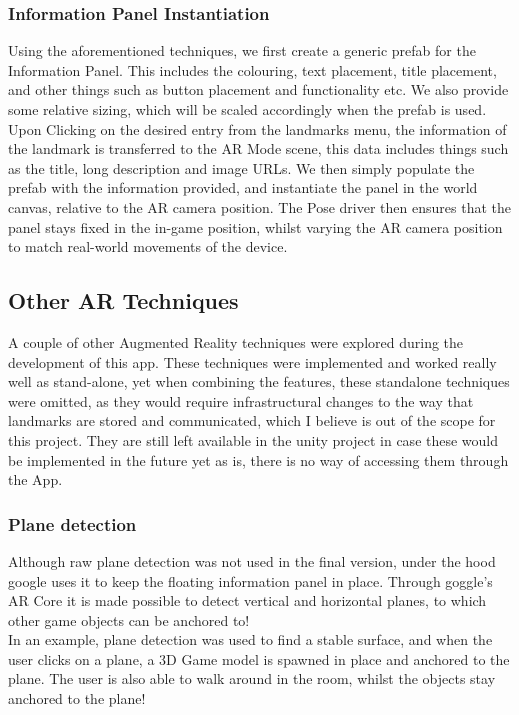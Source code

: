  \subsubsection{Information Panel Instantiation}
 Using the aforementioned techniques, we first create a generic prefab for the Information Panel. This includes the colouring, text placement, title placement, and 
 other things such as button placement and functionality etc. We also provide some relative sizing, which will be scaled accordingly when the prefab is used.\\
 Upon Clicking on the desired entry from the landmarks menu, the information of the landmark is transferred to the AR Mode scene, this data includes things such as 
 the title, long description and image URLs. We then simply populate the prefab with the information provided, and instantiate the panel in the world canvas, 
 relative to the AR camera position. The Pose driver then ensures that the panel stays fixed in the in-game position, whilst varying the AR camera position to 
 match real-world movements of the device. 



 \subsection{Other AR Techniques}
 A couple of other Augmented Reality techniques were explored during the development of this app. 
 These techniques were implemented and worked really well as stand-alone, yet when combining the features, 
 these standalone techniques were omitted, as they would require infrastructural changes to the way that landmarks are stored and communicated, which I believe is out of the scope for this project. They are still left available in the unity project in case these would be implemented in the future yet as is, there is no way of accessing them through the App. 
 \subsubsection{Plane detection}
 Although raw plane detection was not used in the final version, under the hood google uses it to keep the 
 floating information panel in place. Through goggle's AR Core it is made possible to detect vertical 
 and horizontal planes, to which other game objects can be anchored to!\\

 In an example, plane detection was used to find a stable surface, and when the user clicks on a 
 plane, a 3D Game model is spawned in place and anchored to the plane. The user is also able to walk around 
 in the room, whilst the objects stay anchored to the plane! 

